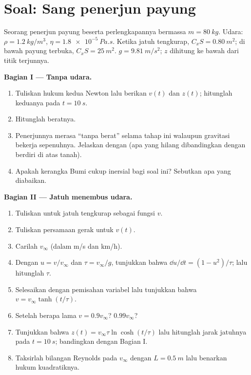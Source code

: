 \section{Soal: Sang penerjun payung}

\begin{problem}
\label{pb:b1:newton-dynamics:1}
Seorang penerjun payung beserta perlengkapannya bermassa $m = \qty{80}{kg}$.
Udara: $\rho = \qty{1.2}{kg/m^3}$, $\eta = \qty{1.8e-5}{Pa.s}$. Ketika
jatuh tengkurap, $C_xS = \qty{0.80}{m^2}$; di bawah payung terbuka, $C_xS =
\qty{25}{m^2}$. $g = \qty{9.81}{m/s^2}$; $z$ dihitung ke bawah
dari titik terjunnya.

\medskip
\noindent\textbf{Bagian I --- Tanpa udara.}
\begin{enumerate}
  \item Tuliskan hukum kedua Newton lalu berikan $v(t)$ dan $z(t)$;
        hitunglah keduanya pada $t = \qty{10}{s}$.
  \item Hitunglah beratnya.
  \item Penerjunnya merasa ``tanpa berat'' selama tahap ini walaupun
        gravitasi bekerja sepenuhnya. Jelaskan dengan  (apa yang
        hilang dibandingkan dengan berdiri di atas tanah).
  \item Apakah kerangka Bumi cukup inersial bagi soal ini? Sebutkan apa
        yang diabaikan.
\end{enumerate}

\medskip
\noindent\textbf{Bagian II --- Jatuh menembus udara.}
\begin{enumerate}[resume]
  \item Tuliskan  untuk jatuh tengkurap sebagai fungsi $v$.
  \item Tuliskan persamaan gerak untuk $v(t)$.
  \item Carilah  $v_\infty$ (dalam \unit{m/s} dan
        \unit{km/h}).
  \item Dengan $u = v/v_\infty$ dan $\tau = v_\infty/g$, tunjukkan bahwa
        $\dd u/\dd t = (1 - u^2)/\tau$; lalu hitunglah $\tau$.
  \item Selesaikan dengan pemisahan variabel lalu tunjukkan bahwa
        $v = v_\infty\tanh(t/\tau)$.
  \item Setelah berapa lama $v = 0.9v_\infty$? $0.99v_\infty$?
  \item Tunjukkan bahwa $z(t) = v_\infty\tau\ln\cosh(t/\tau)$ lalu
        hitunglah jarak jatuhnya pada $t = \qty{10}{s}$; bandingkan
        dengan Bagian I.
  \item Taksirlah bilangan Reynolds pada $v_\infty$ dengan $L = \qty{0.5}{m}$
        lalu benarkan hukum kuadratiknya.
\end{enumerate}


\end{problem}
